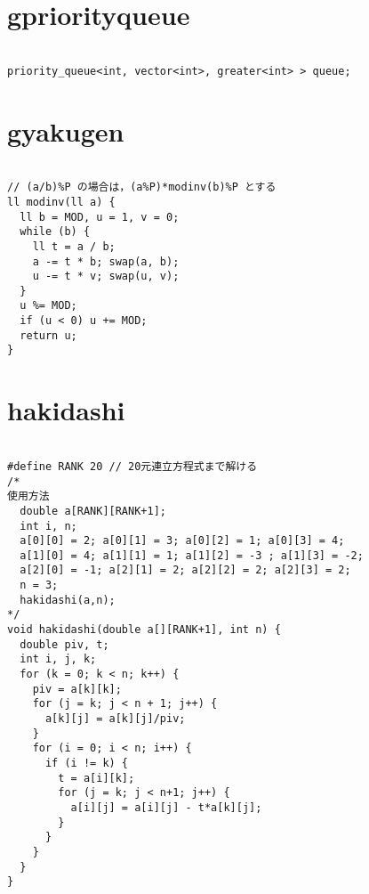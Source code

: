 \documentclass[a4j,titlepage]{jarticle} %
\begin{document}
\color{white}
\section{gpriorityqueue}
\color{black}
\begin{lstlisting}[caption=gpriorityqueue]

priority_queue<int, vector<int>, greater<int> > queue;

\end{lstlisting}

\color{white}
\section{gyakugen}
\color{black}
\begin{lstlisting}[caption=gyakugen]

// (a/b)%P の場合は，(a%P)*modinv(b)%P とする
ll modinv(ll a) {
  ll b = MOD, u = 1, v = 0;
  while (b) {
    ll t = a / b;
    a -= t * b; swap(a, b);
    u -= t * v; swap(u, v);
  }
  u %= MOD;
  if (u < 0) u += MOD;
  return u;
}

\end{lstlisting}

\color{white}
\section{hakidashi}
\color{black}
\begin{lstlisting}[caption=hakidashi]

#define RANK 20 // 20元連立方程式まで解ける
/*
使用方法
  double a[RANK][RANK+1];
  int i, n;
  a[0][0] = 2; a[0][1] = 3; a[0][2] = 1; a[0][3] = 4;
  a[1][0] = 4; a[1][1] = 1; a[1][2] = -3 ; a[1][3] = -2;
  a[2][0] = -1; a[2][1] = 2; a[2][2] = 2; a[2][3] = 2;
  n = 3;
  hakidashi(a,n);
*/
void hakidashi(double a[][RANK+1], int n) { 
  double piv, t;
  int i, j, k;
  for (k = 0; k < n; k++) {
    piv = a[k][k];
    for (j = k; j < n + 1; j++) {
      a[k][j] = a[k][j]/piv;
    }
    for (i = 0; i < n; i++) {
      if (i != k) {
        t = a[i][k];
        for (j = k; j < n+1; j++) {
          a[i][j] = a[i][j] - t*a[k][j];
        }
      }
    }
  }
}

\end{lstlisting}

\color{white}
\end{document}
